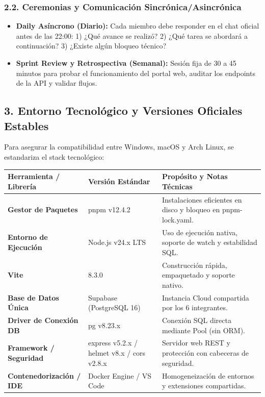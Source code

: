 \documentclass[11pt,a4paper]{article}
\begin{document}
\subsubsection*{2.2. Ceremonias y Comunicación Sincrónica/Asincrónica}
\begin{itemize}
    \item \textbf{Daily Asíncrono (Diario):} Cada miembro debe responder en el chat oficial antes de las 22:00: 1) ¿Qué avance se realizó? 2) ¿Qué tarea se abordará a continuación? 3) ¿Existe algún bloqueo técnico?
    \item \textbf{Sprint Review y Retrospectiva (Semanal):} Sesión fija de 30 a 45 minutos para probar el funcionamiento del portal web, auditar los endpoints de la API y validar flujos.
\end{itemize}

\subsection*{3. Entorno Tecnológico y Versiones Oficiales Estables}
Para asegurar la compatibilidad entre Windows, macOS y Arch Linux, se estandariza el stack tecnológico:

\begin{table}[H]
\centering
\renewcommand{\arraystretch}{1.3}
\begin{tabularx}{\textwidth}{|>{\bfseries}p{4cm}|p{3.5cm}|X|}
\hline
\rowcolor{gray!20} Herramienta / Librería & Versión Estándar & Propósito y Notas Técnicas \\
\hline
Gestor de Paquetes & pnpm v12.4.2 & Instalaciones eficientes en disco y bloqueo en pnpm-lock.yaml. \\
\hline
Entorno de Ejecución & Node.js v24.x LTS & Uso de ejecución nativa, soporte de watch y estabilidad SQL. \\
\hline
Vite & 8.3.0 & Construcción rápida, empaquetado y soporte nativo. \\
\hline
Base de Datos Única & Supabase (PostgreSQL 16) & Instancia Cloud compartida por los 6 integrantes. \\
\hline
Driver de Conexión DB & pg v8.23.x & Conexión SQL directa mediante Pool (sin ORM). \\
\hline
Framework / Seguridad & express v5.2.x / helmet v8.x / cors v2.8.x & Servidor web REST y protección con cabeceras de seguridad. \\
\hline
Contenedorización / IDE & Docker Engine / VS Code & Homogeneización de entornos y extensiones compartidas. \\
\hline
\end{tabularx}
\end{table}
\end{document}
